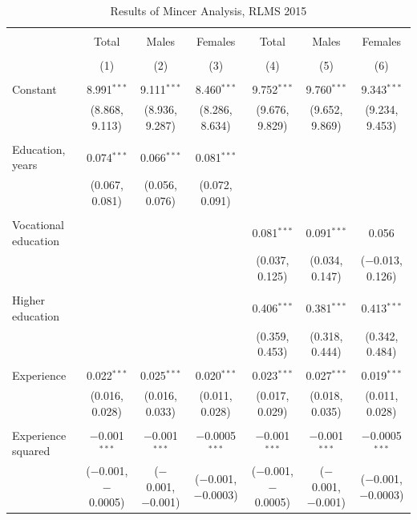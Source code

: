 \documentclass[12pt,a4paper]{article}
\numberwithin{equation}{section}
\begin{document}
\begin{landscape}
	
	\fontsize{9}{11}
	\selectfont
	
	\begin{table}[!htbp] \centering 
		\caption{Results of Mincer Analysis, RLMS 2015} 
		\label{} 
		\begin{tabular}{@{\extracolsep{5pt}}lcccccc} 
			\\[-1.8ex]\hline 
			\hline \\[-1.8ex] 
			& Total & Males & Females & Total & Males & Females \\ 
			\\[-1.8ex] & (1) & (2) & (3) & (4) & (5) & (6)\\ 
			\hline \\[-1.8ex] 
			Constant & 8.991$^{***}$ & 9.111$^{***}$ & 8.460$^{***}$ & 9.752$^{***}$ & 9.760$^{***}$ & 9.343$^{***}$ \\ 
			& (8.868, 9.113) & (8.936, 9.287) & (8.286, 8.634) & (9.676, 9.829) & (9.652, 9.869) & (9.234, 9.453) \\ 
			& & & & & & \\ 
			Education, years & 0.074$^{***}$ & 0.066$^{***}$ & 0.081$^{***}$ &  &  &  \\ 
			& (0.067, 0.081) & (0.056, 0.076) & (0.072, 0.091) &  &  &  \\ 
			& & & & & & \\ 
			Vocational education &  &  &  & 0.081$^{***}$ & 0.091$^{***}$ & 0.056 \\ 
			&  &  &  & (0.037, 0.125) & (0.034, 0.147) & ($-$0.013, 0.126) \\ 
			& & & & & & \\ 
			Higher education &  &  &  & 0.406$^{***}$ & 0.381$^{***}$ & 0.413$^{***}$ \\ 
			&  &  &  & (0.359, 0.453) & (0.318, 0.444) & (0.342, 0.484) \\ 
			& & & & & & \\ 
			Experience & 0.022$^{***}$ & 0.025$^{***}$ & 0.020$^{***}$ & 0.023$^{***}$ & 0.027$^{***}$ & 0.019$^{***}$ \\ 
			& (0.016, 0.028) & (0.016, 0.033) & (0.011, 0.028) & (0.017, 0.029) & (0.018, 0.035) & (0.011, 0.028) \\ 
			& & & & & & \\ 
			Experience squared & $-$0.001$^{***}$ & $-$0.001$^{***}$ & $-$0.0005$^{***}$ & $-$0.001$^{***}$ & $-$0.001$^{***}$ & $-$0.0005$^{***}$ \\ 
			& ($-$0.001, $-$0.0005) & ($-$0.001, $-$0.001) & ($-$0.001, $-$0.0003) & ($-$0.001, $-$0.0005) & ($-$0.001, $-$0.001) & ($-$0.001, $-$0.0003) \\ 

\end{tabular}
\end{table}
\end{landscape}
\end{document}
